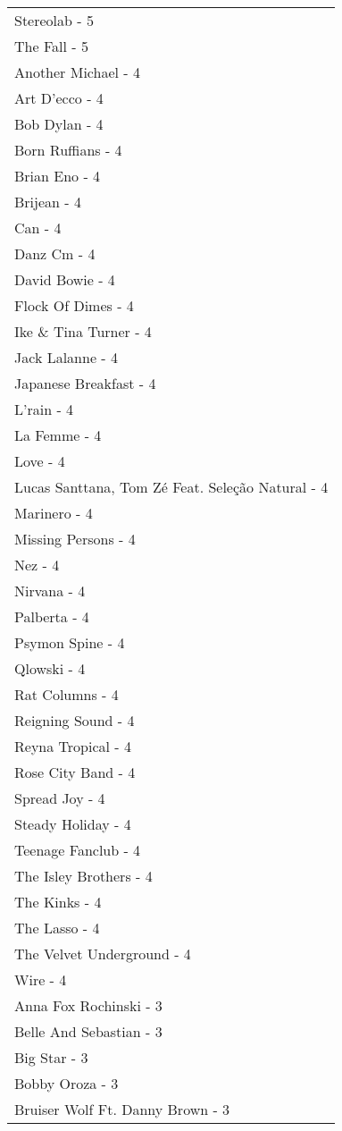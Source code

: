 \documentclass[
]{article}
\begin{document}
\begin{longtable}{l}
Stereolab - 5 \\ 
The Fall - 5 \\ 
Another Michael - 4 \\ 
Art D'ecco - 4 \\ 
Bob Dylan - 4 \\ 
Born Ruffians - 4 \\ 
Brian Eno - 4 \\ 
Brijean - 4 \\ 
Can - 4 \\ 
Danz Cm - 4 \\ 
David Bowie - 4 \\ 
Flock Of Dimes - 4 \\ 
Ike \& Tina Turner - 4 \\ 
Jack Lalanne - 4 \\ 
Japanese Breakfast - 4 \\ 
L'rain - 4 \\ 
La Femme - 4 \\ 
Love - 4 \\ 
Lucas Santtana, Tom Zé Feat. Seleção Natural - 4 \\ 
Marinero - 4 \\ 
Missing Persons - 4 \\ 
Nez - 4 \\ 
Nirvana - 4 \\ 
Palberta - 4 \\ 
Psymon Spine - 4 \\ 
Qlowski - 4 \\ 
Rat Columns - 4 \\ 
Reigning Sound - 4 \\ 
Reyna Tropical - 4 \\ 
Rose City Band - 4 \\ 
Spread Joy - 4 \\ 
Steady Holiday - 4 \\ 
Teenage Fanclub - 4 \\ 
The Isley Brothers - 4 \\ 
The Kinks - 4 \\ 
The Lasso - 4 \\ 
The Velvet Underground - 4 \\ 
Wire - 4 \\ 
Anna Fox Rochinski - 3 \\ 
Belle And Sebastian - 3 \\ 
Big Star - 3 \\ 
Bobby Oroza - 3 \\ 
Bruiser Wolf Ft. Danny Brown - 3 \\ 

\end{longtable}
\end{document}
